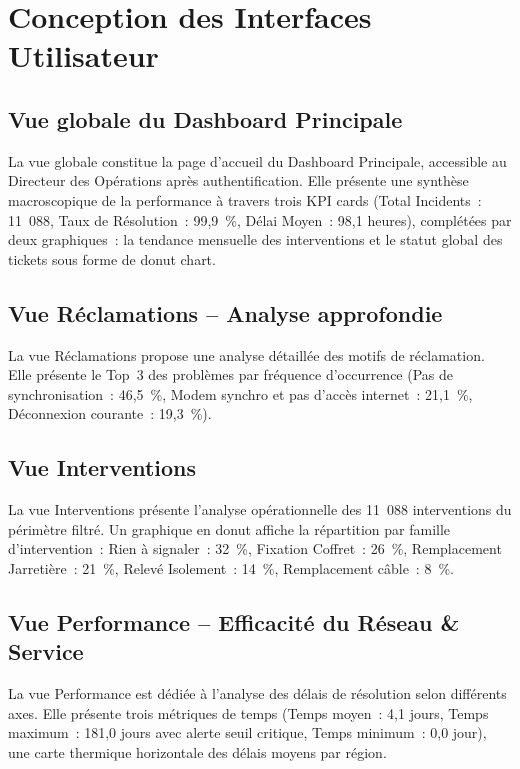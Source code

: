 \documentclass[11pt,a4paper]{report}
\begin{document}
\section{Conception des Interfaces Utilisateur}

\subsection{Vue globale du Dashboard Principale}

La vue globale constitue la page d'accueil du Dashboard Principale, accessible au Directeur des Opérations après authentification. Elle présente une synthèse macroscopique de la performance à travers trois KPI cards (Total Incidents~: 11~088, Taux de Résolution~: 99,9~\%, Délai Moyen~: 98,1 heures), complétées par deux graphiques~: la tendance mensuelle des interventions et le statut global des tickets sous forme de donut chart.

\subsection{Vue Réclamations -- Analyse approfondie}

La vue Réclamations propose une analyse détaillée des motifs de réclamation. Elle présente le Top~3 des problèmes par fréquence d'occurrence (Pas de synchronisation~: 46,5~\%, Modem synchro et pas d'accès internet~: 21,1~\%, Déconnexion courante~: 19,3~\%).

\subsection{Vue Interventions}

La vue Interventions présente l'analyse opérationnelle des 11~088 interventions du périmètre filtré. Un graphique en donut affiche la répartition par famille d'intervention~: Rien à signaler~: 32~\%, Fixation Coffret~: 26~\%, Remplacement Jarretière~: 21~\%, Relevé Isolement~: 14~\%, Remplacement câble~: 8~\%.

\subsection{Vue Performance -- Efficacité du Réseau \& Service}

La vue Performance est dédiée à l'analyse des délais de résolution selon différents axes. Elle présente trois métriques de temps (Temps moyen~: 4,1 jours, Temps maximum~: 181,0 jours avec alerte seuil critique, Temps minimum~: 0,0 jour), une carte thermique horizontale des délais moyens par région.
\end{document}

